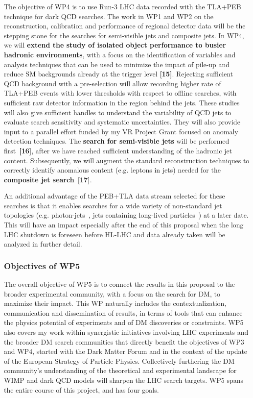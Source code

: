 The objective of WP4 is to use Run-3 LHC data recorded with the TLA+PEB technique for dark QCD searches. 
The work in WP1 and WP2 on the reconstruction, calibration and performance of regional detector data will be the stepping stone for the searches for semi-visible jets and composite jets. 
In WP4, we will \textbf{extend the study of isolated object performance to busier hadronic environments}, with a focus on the identification of variables and analysis techniques that can be used to minimize the impact of pile-up and reduce SM backgrounds already at the trigger level \textbf{[15]}. 
Rejecting sufficient QCD background with a pre-selection will allow recording higher rate of TLA+PEB events with lower thresholds with respect to offline searches, with sufficient raw detector information in the region behind the jets. 
These studies will also give sufficient handles to understand the variability of QCD jets to evaluate search sensitivity and systematic uncertainties.
They will also provide input to a parallel effort funded by my VR Project Grant focused on anomaly detection techniques.  
The \textbf{search for semi-visible jets} will be performed first~\textbf{[16]}, after we have reached sufficient understanding of the hadronic jet content. 
Subsequently, we will augment the standard reconstruction techniques to correctly identify anomalous content (e.g. leptons in jets) needed for the \textbf{composite jet search}~\textbf{[17]}.

An additional advantage of the PEB+TLA data stream selected for these searches is that it enables searches for a wide variety of non-standard jet topologies (e.g. photon-jets~\cite{PhotonJets}, jets containing long-lived particles~\cite{PhotonJets}) at a later date. 
This will have an impact especially after the end of this proposal when the long LHC shutdown is foreseen before HL-LHC and data already taken will be analyzed in further detail. 

\subsubsection{Objectives of WP5}

The overall objective of WP5 is to connect the results in this proposal to the broader experimental community, with a focus on the search for DM, to maximize their impact. 
This WP naturally includes the contextualization, communication and dissemination of results, in terms of tools that can enhance the physics potential of experiments and of DM discoveries or constraints. WP5 also covers my work within synergistic initiatives involving LHC experiments and the broader DM search communities that directly benefit the objectives of WP3 and WP4, started with the Dark Matter Forum and in the context of the update of the European Strategy of Particle Physics. Collectively furthering the DM community’s understanding of the theoretical and experimental landscape for WIMP and dark QCD models will sharpen the LHC search targets. WP5 spans the entire course of this project, and has four goals. 


